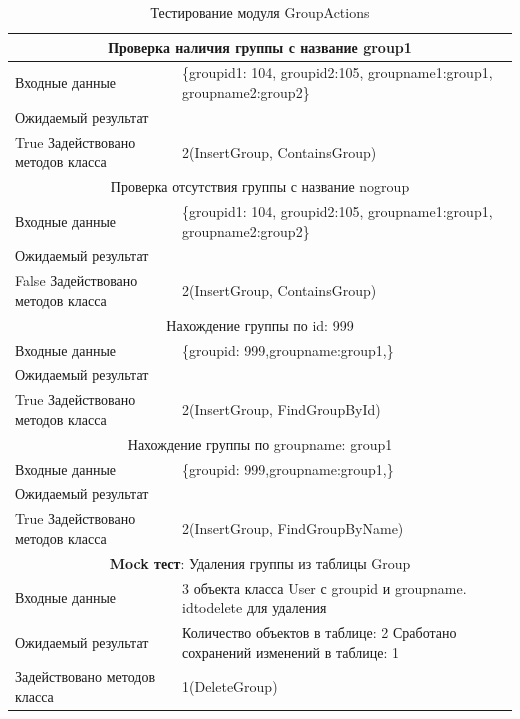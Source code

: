\begin{table} 
	\caption{\label{tab:maintable}Тестирование модуля GroupActions}
	\begin{center}
		\begin{tabular}{|l|p{10cm}|}
			\hline
			\multicolumn{2}{|c|}{Проверка наличия группы с название group1} \\
			\hline
			Входные данные & \{groupid1: 104, groupid2:105, groupname1:group1, groupname2:group2\} \\
			Ожидаемый результат &  \\ True
			Задействовано методов класса & 2(InsertGroup, ContainsGroup)\\
			\hline
			\multicolumn{2}{|c|}{Проверка отсутствия группы с название nogroup} \\
			\hline
			Входные данные & \{groupid1: 104, groupid2:105, groupname1:group1, groupname2:group2\} \\
			Ожидаемый результат &  \\ False
			Задействовано методов класса & 2(InsertGroup, ContainsGroup)\\
			\hline
			\multicolumn{2}{|c|}{Нахождение группы по id: 999} \\
			\hline
			Входные данные & \{groupid: 999,groupname:group1,\} \\
			Ожидаемый результат &  \\ True
			Задействовано методов класса & 2(InsertGroup, FindGroupById)\\
			\hline
			\multicolumn{2}{|c|}{Нахождение группы по groupname: group1} \\
			\hline
			Входные данные & \{groupid: 999,groupname:group1,\} \\
			Ожидаемый результат &  \\ True
			Задействовано методов класса & 2(InsertGroup, FindGroupByName)\\
			\hline
			\multicolumn{2}{|c|}{\textbf{Mock тест}: Удаления группы из таблицы Group} \\
			\hline
			Входные данные & 3 объекта класса User с groupid и groupname. idtodelete для удаления \\
			Ожидаемый результат &   Количество объектов в таблице: 2 Сработано сохранений изменений в таблице: 1 \\
			Задействовано методов класса & 1(DeleteGroup)\\
			\hline
			

		\end{tabular}
	\end{center}
\end{table} 


